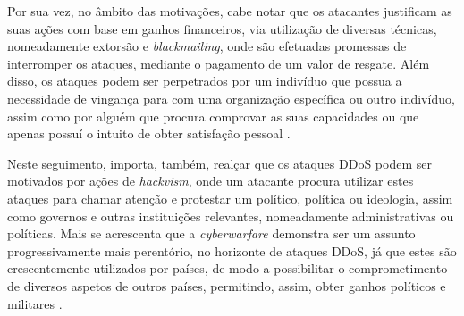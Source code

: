 Por sua vez, no âmbito das motivações, cabe notar que os atacantes justificam as suas ações com base em ganhos financeiros, via utilização de diversas técnicas, nomeadamente extorsão e \textit{blackmailing}, onde são efetuadas promessas de interromper os ataques, mediante o pagamento de um valor de resgate. Além disso, os ataques podem ser perpetrados por um indivíduo que possua a necessidade de vingança para com uma organização específica ou outro indivíduo, assim como por alguém que procura comprovar as suas capacidades ou que apenas possuí o intuito de obter satisfação pessoal \cite{cybergc_defending_agaisnt_ddos,perimeter81_ddos_motivations}.


Neste seguimento, importa, também, realçar que os ataques DDoS podem ser motivados por ações de \textit{hackvism}, onde um atacante procura utilizar estes ataques para chamar atenção e protestar um político, política ou ideologia, assim como governos e outras instituições relevantes, nomeadamente administrativas ou políticas. Mais se acrescenta que a \textit{cyberwarfare} demonstra ser um assunto progressivamente mais perentório, no horizonte de ataques DDoS, já que estes são crescentemente utilizados por países, de modo a possibilitar o comprometimento de diversos aspetos de outros países, permitindo, assim, obter ganhos políticos e militares \cite{cybergc_defending_agaisnt_ddos,perimeter81_ddos_motivations}.